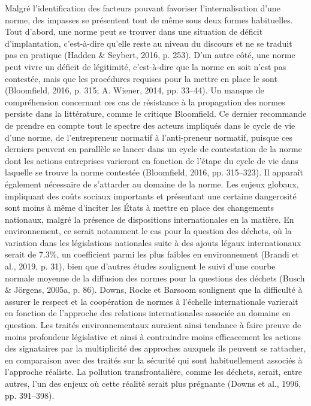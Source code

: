 \documentclass[12pt]{ulaval}
\begin{document}
Malgré l'identification des facteurs pouvant favoriser l'internalisation d'une norme, des impasses se présentent tout de même sous deux formes habituelles. Tout d'abord, une norme peut se trouver dans une situation de déficit d'implantation, c'est-à-dire qu'elle reste au niveau du discours et ne se traduit pas en pratique (Hadden \& Seybert, 2016, p. 253). D'un autre côté, une norme peut vivre un déficit de légitimité, c'est-à-dire que la norme en soit n'est pas contestée, mais que les procédures requises pour la mettre en place le sont (Bloomfield, 2016, p. 315; A. Wiener, 2014, pp. 33--44). Un manque de compréhension concernant ces cas de résistance à la propagation des normes persiste dans la littérature, comme le critique Bloomfield. Ce dernier recommande de prendre en compte tout le spectre des acteurs impliqués dans le cycle de vie d'une norme, de l'entrepreneur normatif à l'anti-preneur normatif, puisque ces derniers peuvent en parallèle se lancer dans un cycle de contestation de la norme dont les actions entreprises varieront en fonction de l'étape du cycle de vie dans laquelle se trouve la norme contestée (Bloomfield, 2016, pp. 315--323). Il apparaît également nécessaire de s'attarder au domaine de la norme. Les enjeux globaux, impliquant des coûts sociaux importants et présentant une certaine dangerosité sont moins à même d'inciter les États à mettre en place des changements nationaux, malgré la présence de dispositions internationales en la matière. En environnement, ce serait notamment le cas pour la question des déchets, où la variation dans les législations nationales suite à des ajouts légaux internationaux serait de 7.3\%, un coefficient parmi les plus faibles en environnement (Brandi et al., 2019, p. 31), bien que d'autres études soulignent le suivi d'une courbe normale moyenne de la diffusion des normes pour la questions des déchets (Busch \& Jörgens, 2005a, p. 86). Downs, Rocke et Barsoom soulignent que la difficulté à assurer le respect et la coopération de normes à l'échelle internationale varierait en fonction de l'approche des relations internationales associée au domaine en question. Les traités environnementaux auraient ainsi tendance à faire preuve de moins profondeur législative et ainsi à contraindre moins efficacement les actions des signataires par la multiplicité des approches auxquels ils peuvent se rattacher, en comparaison avec des traités sur la sécurité qui sont habituellement associés à l'approche réaliste. La pollution transfrontalière, comme les déchets, serait, entre autres, l'un des enjeux où cette réalité serait plus prégnante (Downs et al., 1996, pp. 391--398).
\end{document}
